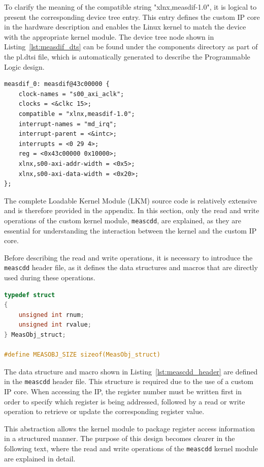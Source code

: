 To clarify the meaning of the compatible string "xlnx,measdif-1.0", it is logical 
to present the corresponding device tree entry. This entry defines the custom IP 
core in the hardware description and enables the Linux kernel to match the device 
with the appropriate kernel module. The device tree node shown in 
Listing~\ref{lst:measdif_dts} can be found under the components directory as 
part of the pl.dtsi file, which is automatically generated to describe the 
Programmable Logic design.

\begin{lstlisting}[caption={MNG Payload structure}, label={lst:measdif_dts}]
measdif_0: measdif@43c00000 {
    clock-names = "s00_axi_aclk";
    clocks = <&clkc 15>;
    compatible = "xlnx,measdif-1.0";
    interrupt-names = "md_irq";
    interrupt-parent = <&intc>;
    interrupts = <0 29 4>;
    reg = <0x43c00000 0x10000>;
    xlnx,s00-axi-addr-width = <0x5>;
    xlnx,s00-axi-data-width = <0x20>;
};
\end{lstlisting}


The complete Loadable Kernel Module (LKM) source code is relatively extensive 
and is therefore provided in the appendix. In this section, only the read and 
write operations of the custom kernel module, \texttt{meascdd}, are explained, 
as they are essential for understanding the interaction between the kernel and 
the custom IP core.

Before describing the read and write operations, it is necessary to introduce 
the \texttt{meascdd} header file, as it defines the data structures and macros 
that are directly used during these operations.

\begin{lstlisting}[language=C,
caption={Data structure and macro definitions in the meascdd header file},
label={lst:meascdd_header}]
typedef struct 
{
    unsigned int rnum;
    unsigned int rvalue;
} MeasObj_struct;

#define MEASOBJ_SIZE sizeof(MeasObj_struct)
\end{lstlisting}

The data structure and macro shown in Listing~\ref{lst:meascdd_header} are defined 
in the \texttt{meascdd} header file. This structure is required due to the use 
of a custom IP core. When accessing the IP, the register number must be written 
first in order to specify which register is being addressed, followed by a read 
or write operation to retrieve or update the corresponding register value.

This abstraction allows the kernel module to package register access information 
in a structured manner. The purpose of this design becomes clearer in the 
following text, where the read and write operations of the \texttt{meascdd} 
kernel module are explained in detail.

